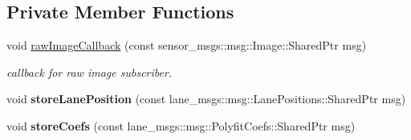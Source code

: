 \subsection*{Private Member Functions}
\begin{DoxyCompactItemize}
\item 
void \hyperlink{classLaneVisualizationNode_a659b897bbab6410ac46e7ada948b7de2}{raw\+Image\+Callback} (const sensor\+\_\+msgs\+::msg\+::\+Image\+::\+Shared\+Ptr msg)
\begin{DoxyCompactList}\small\item\em callback for raw image subscriber. \end{DoxyCompactList}\item 
\mbox{\label{classLaneVisualizationNode_acc79d01a5c9f6ef2d3028742376c389d}} 
void {\bfseries store\+Lane\+Position} (const lane\+\_\+msgs\+::msg\+::\+Lane\+Positions\+::\+Shared\+Ptr msg)
\item 
\mbox{\label{classLaneVisualizationNode_a94d31de5b98a84e8d47113f57071edc8}} 
void {\bfseries store\+Coefs} (const lane\+\_\+msgs\+::msg\+::\+Polyfit\+Coefs\+::\+Shared\+Ptr msg)
\end{DoxyCompactItemize}
